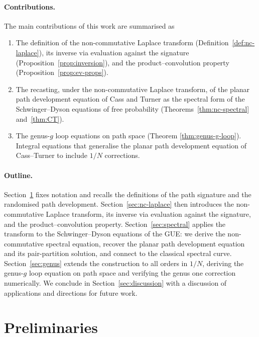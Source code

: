 \documentclass[11pt,a4paper]{article}
\begin{document}
\paragraph{Contributions.}
The main contributions of this work are summarised as
\begin{enumerate}
\item The definition of the non-commutative Laplace transform (Definition~\ref{def:nc-laplace}), its inverse via evaluation against the signature (Proposition~\ref{prop:inversion}), and the product--convolution property (Proposition~\ref{prop:ev-props}).

  \item The recasting, under the non-commutative Laplace transform, of the planar path development equation of Cass and Turner \cite{cass2026free} as the spectral form of the Schwinger--Dyson equations of free probability (Theorems~\ref{thm:nc-spectral} and~\ref{thm:CT}).
\item The genus-$g$ loop equations on path space 
  (Theorem \ref{thm:genus-g-loop}). Integral equations that generalise the planar path development equation of Cass--Turner to include $1/N$ corrections.
\end{enumerate}

\paragraph{Outline.}
Section~\ref{sec:setup} fixes notation and recalls the definitions of the path signature and the randomised path development. Section~\ref{sec:nc-laplace} then introduces the non-commutative Laplace transform, its inverse via evaluation against the signature, and the product--convolution property. Section~\ref{sec:spectral} applies the transform to the Schwinger--Dyson equations of the GUE: we derive the non-commutative spectral equation, recover the planar path development equation and its pair-partition solution, and connect to the classical spectral curve. Section~\ref{sec:genus} extends the construction to all orders in $1/N$, deriving the genus-$g$ loop equation on path space and verifying the genus one correction numerically. We conclude in Section~\ref{sec:discussion} with a discussion of applications and directions for future work.
 

\section{Preliminaries}\label{sec:setup}
\end{document}
